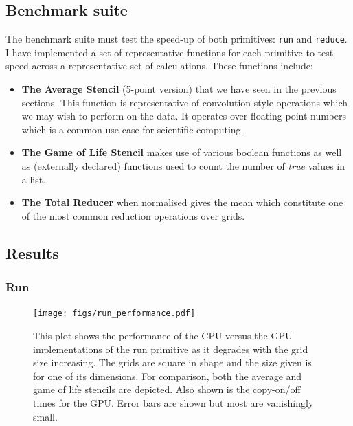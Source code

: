 \documentclass[
    12pt,
    a4paper,
    twoside,
    openright,
    ]{scrbook}
\begin{document}
\subsection{Benchmark suite}

The benchmark suite must test the speed-up of both primitives: \texttt{run} and
\texttt{reduce}. I have implemented a set of representative functions for each
primitive to test speed across a representative set of calculations. These
functions include:

\begin{itemize}
\itemsep1pt\parskip0pt
\item \textbf{The Average Stencil} (5-point version)  that we have seen in the previous sections. This function is
  representative of convolution style operations which we may wish to perform on
  the data. It operates over floating point numbers which is a common use case
  for scientific computing.
\item \textbf{The Game of Life Stencil} makes use
  of various boolean functions as well as (externally declared) functions used
  to count the number of \emph{true} values in a list.
\item \textbf{The Total Reducer} when normalised gives the mean
  which constitute one of the most common reduction operations over grids.
\end{itemize}

\subsection{Results}

\subsubsection{Run}

\begin{figure}[h]
  \texttt{[image: figs/run\_performance.pdf]}
  \caption{This plot shows the performance of the CPU versus the GPU
    implementations of the run primitive as it degrades with the grid size
    increasing. The grids are square in shape and the size given is for one of
    its dimensions. For comparison, both the average and game of life stencils
    are depicted. Also shown is the copy-on/off times for the GPU. Error bars
    are shown but most are vanishingly small.}
  \label{fig:runperf100}
\end{figure}
\end{document}
